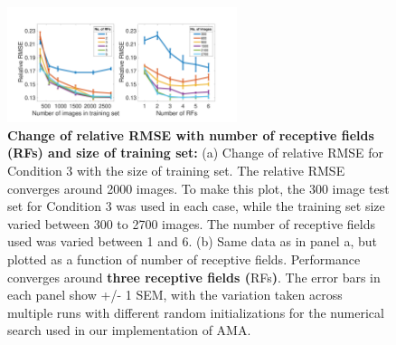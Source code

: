 \documentclass{jov}
\providecommand{\DIFaddtex}[1]{{\bf #1}} %
\providecommand{\DIFdeltex}[1]{} %
\providecommand{\DIFaddFL}[1]{\DIFadd{#1}} %
\providecommand{\DIFdelFL}[1]{\DIFdel{#1}} %
\providecommand{\DIFaddbeginFL}{} %
\providecommand{\DIFaddendFL}{} %
\providecommand{\DIFdelbeginFL}{} %
\providecommand{\DIFdelendFL}{} %
\providecommand{\DIFadd}[1]{\texorpdfstring{\DIFaddtex{#1}}{#1}} %
\providecommand{\DIFdel}[1]{\texorpdfstring{\DIFdeltex{#1}}{}} %
\newcommand{\DIFscaledelfig}{0.5}
\newlength{\DIFdelgraphicswidth} %
\newlength{\DIFdelgraphicsheight} %
\newcommand{\DIFaddincludegraphics}[2][]{{\color{blue}\fbox{\DIFOincludegraphics[#1]{#2}}}} %
\newcommand{\DIFdelincludegraphics}[2][]{%
\sbox{\DIFdelgraphicsbox}{\DIFOincludegraphics[#1]{#2}}%
\settoboxwidth{\DIFdelgraphicswidth}{\DIFdelgraphicsbox} %
\settoboxtotalheight{\DIFdelgraphicsheight}{\DIFdelgraphicsbox} %
\scalebox{\DIFscaledelfig}{%
\parbox[b]{\DIFdelgraphicswidth}{\usebox{\DIFdelgraphicsbox}\\[-\baselineskip] \rule{\DIFdelgraphicswidth}{0em}}\llap{\resizebox{\DIFdelgraphicswidth}{\DIFdelgraphicsheight}{%
\setlength{\unitlength}{\DIFdelgraphicswidth}%
\begin{picture}(1,1)%
\thicklines\linethickness{2pt} %
{\color[rgb]{1,0,0}\put(0,0){\framebox(1,1){}}}%
{\color[rgb]{1,0,0}\put(0,0){\line( 1,1){1}}}%
{\color[rgb]{1,0,0}\put(0,1){\line(1,-1){1}}}%
\end{picture}%
}\hspace*{3pt}}} %
} %
\DeclareRobustCommand{\DIFaddbeginFL}{\DIFOaddbeginFL \let\includegraphics\DIFaddincludegraphics} %
\DeclareRobustCommand{\DIFaddendFL}{\DIFOaddendFL \let\includegraphics\DIFOincludegraphics} %
\DeclareRobustCommand{\DIFdelbeginFL}{\DIFOdelbeginFL \let\includegraphics\DIFdelincludegraphics} %
\DeclareRobustCommand{\DIFdelendFL}{\DIFOaddendFL \let\includegraphics\DIFOincludegraphics} %
\begin{document}
\begin{figure}
\centering
\includegraphics[width=0.6\textwidth]{../FiguresDraft5/Figure13/Figure13.pdf}
\caption{{\bf Change of relative RMSE with number of receptive fields (RFs) and size of training set:} (a) Change of relative RMSE for Condition 3 with the size of training set. The relative RMSE converges around 2000 images. To make this plot, the 300 image test set for Condition 3 was used in each case, while the training set size varied between 300 to 2700 images. The number of receptive fields used was varied between 1 and 6. (b) Same data as in panel a, but plotted as a function of number of receptive fields. Performance converges around \DIFdelbeginFL \DIFdelFL{3 }\DIFdelendFL \DIFaddbeginFL \DIFaddFL{three receptive fields (}\DIFaddendFL RFs\DIFaddbeginFL \DIFaddFL{)}\DIFaddendFL . The error bars in each panel show +/- 1 SEM, with the variation taken across multiple runs with different random initializations for the numerical search used in our implementation of AMA.}
 \label{fig:RMSEvsRF}
\end{figure}
\end{document}
